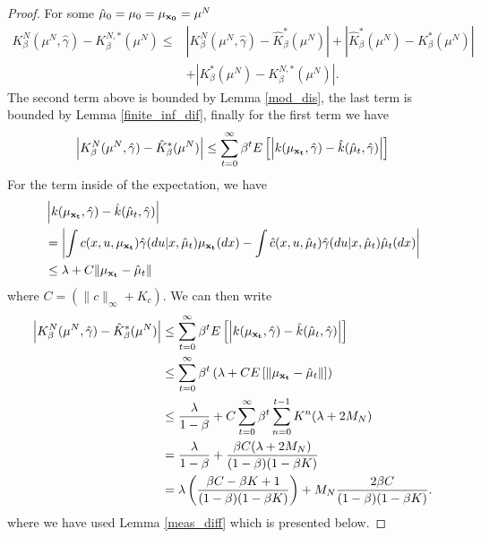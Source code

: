 \documentclass[twoside,11pt]{article}
\begin{document}
\begin{proof}
 For some $\hat{\mu}_0=\mu_0 = \mu_{\bf x_0}=\mu^N$
\begin{align*}
K_\beta^N(\mu^N,\hat{\gamma}) - K_\beta^{N,*}(\mu^N)  \leq &\left|K_\beta^N(\mu^N,\hat{\gamma}) - \hat{K}^*_\beta(\mu^N)\right|+ \left|  \hat{K}^*_\beta(\mu^N) - K^*_\beta(\mu^N)\right| \\
&+ \left|  K^*_\beta(\mu^N) - K_\beta^{N,*}(\mu^N) \right|.
\end{align*}
The second term above is bounded by Lemma \ref{mod_dis}, the last term is bounded by Lemma \ref{finite_inf_dif}, finally for the first term we have
\begin{align*}
\left|K_\beta^N(\mu^N,\hat{\gamma}) - \hat{K}^*_\beta(\mu^N)\right| \leq \sum_{t=0}^\infty \beta^t E\left[ \left|k(\mu_{\bf x_t},\hat{\gamma}) - \hat{k}(\hat{\mu}_t,\hat{\gamma})\right|\right]
\end{align*}
For the term inside of the expectation, we have
\begin{align*}
& \left|k(\mu_{\bf x_t},\hat{\gamma}) - \hat{k}(\hat{\mu}_t,\hat{\gamma})\right| \\
&= \left| \int c(x,u,\mu_{\bf x_t})\hat{\gamma}(du|x,\hat{\mu}_t)\mu_{\bf x_t}(dx) - \int \hat{c}(x,u,\hat{\mu}_t)\hat{\gamma}(du|x,\hat{\mu}_t) \hat{\mu}_t(dx)  \right|\\
& \leq \lambda + C\|\mu_{\bf x_t} - \hat{\mu}_t\| 
\end{align*}
where $C=(\|c\|_\infty + K_c)$. We can then write
\begin{align*}
\left|K_\beta^N(\mu^N,\hat{\gamma}) - \hat{K}^*_\beta(\mu^N)\right| &\leq \sum_{t=0}^\infty \beta^t E\left[ \left|k(\mu_{\bf x_t},\hat{\gamma}) - \hat{k}(\hat{\mu}_t,\hat{\gamma})\right|\right] \\
&\leq \sum_{t=0}^\infty \beta^t \left( \lambda + C E\left[\|\mu_{\bf x_t} - \hat{\mu}_t\| \right]\right)\\
& \leq \frac{\lambda}{1-\beta} + C\sum_{t=0}^\infty \beta^t  \sum_{n=0}^{t-1} K^n( \lambda + 2 M_N )\\
&=  \frac{\lambda}{1-\beta}  + \frac{\beta C (\lambda + 2M_N)}{(1-\beta)(1-\beta K)}\\
& = \lambda\left( \frac{\beta C- \beta K +1}{(1-\beta)(1-\beta K)}  \right)  + M_N \frac{2\beta C}{(1-\beta)(1-\beta K)}.
\end{align*}
where we have used Lemma \ref{meas_diff} which is presented below.
\end{proof}
\end{document}
